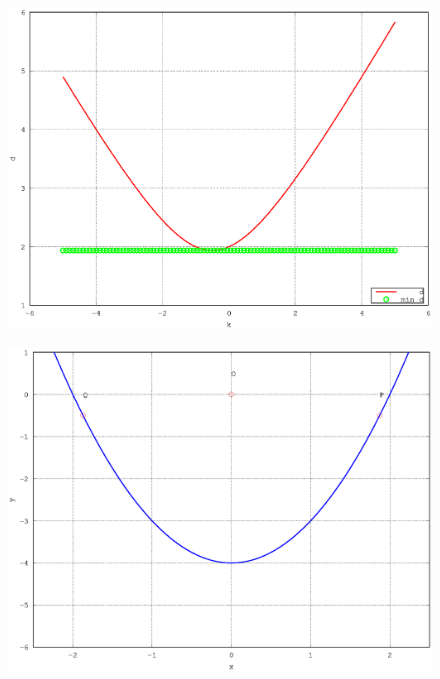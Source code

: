 \documentclass[journal,12pt,twocolumn]{IEEEtran}
\begin{document}
\begin{figure}[!ht]
\begin{center}
\includegraphics[width=\columnwidth]{./version_2/ee16b1007/ee16b1007a}
\end{center}
\label{fig_7a}	
\end{figure}
%
\begin{figure}
\begin{center}
\includegraphics[width=\columnwidth]{./version_2/ee16b1007/ee16b1007b}
\end{center}
\label{fig_7b}	
\end{figure}
\end{document}
